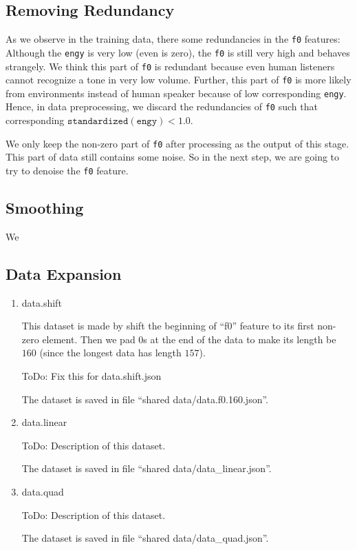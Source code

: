 \documentclass[a4paper]{article}
\begin{document}
\subsection{Removing Redundancy}
As we observe in the training data, there some redundancies in the \texttt{f0} features: Although the \texttt{engy} is very low (even is zero), the \texttt{f0} is still very high and behaves strangely. We think this part of \texttt{f0} is redundant because even human listeners cannot recognize a tone in very low volume. Further, this part of \texttt{f0} is more likely from environments instead of human speaker because of low corresponding \texttt{engy}. Hence, in data preprocessing, we discard the redundancies of \texttt{f0} such that corresponding $\mathtt{standardized(engy)} < 1.0$. 

We only keep the non-zero part of \texttt{f0} after processing as the output of this stage. This part of data still contains some noise. So in the next step, we are going to try to denoise the \texttt{f0} feature.

\subsection{Smoothing}
	We 

\subsection{Data Expansion}
\begin{enumerate}
\item data.shift

	This dataset is made by shift the beginning of ``f0'' feature to its first non-zero element. Then we pad $0$s at the end of the data to make its length be $160$ (since the longest data has length $157$).

	ToDo: Fix this for data.shift.json

	The dataset is saved in file ``shared data/data.f0.160.json''.
\item data.linear

	ToDo: Description of this dataset.

	The dataset is saved in file ``shared data/data\_linear.json''.

\item data.quad
	
	ToDo: Description of this dataset.

	The dataset is saved in file ``shared data/data\_quad.json''.

\end{enumerate}
\end{document}
